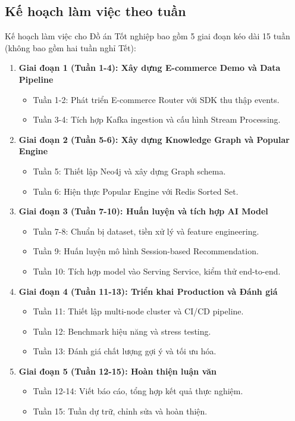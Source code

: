 \subsection{Kế hoạch làm việc theo tuần}

Kế hoạch làm việc cho Đồ án Tốt nghiệp bao gồm 5 giai đoạn kéo dài 15 tuần (không bao gồm hai tuần nghỉ Tết):

\begin{enumerate}
    \item \textbf{Giai đoạn 1 (Tuần 1-4): Xây dựng E-commerce Demo và Data Pipeline}
    \begin{itemize}
        \item Tuần 1-2: Phát triển E-commerce Router với SDK thu thập events.
        \item Tuần 3-4: Tích hợp Kafka ingestion và cấu hình Stream Processing.
    \end{itemize}

    \item \textbf{Giai đoạn 2 (Tuần 5-6): Xây dựng Knowledge Graph và Popular Engine}
    \begin{itemize}
        \item Tuần 5: Thiết lập Neo4j và xây dựng Graph schema.
        \item Tuần 6: Hiện thực Popular Engine với Redis Sorted Set.
    \end{itemize}

    \item \textbf{Giai đoạn 3 (Tuần 7-10): Huấn luyện và tích hợp AI Model}
    \begin{itemize}
        \item Tuần 7-8: Chuẩn bị dataset, tiền xử lý và feature engineering.
        \item Tuần 9: Huấn luyện mô hình Session-based Recommendation.
        \item Tuần 10: Tích hợp model vào Serving Service, kiểm thử end-to-end.
    \end{itemize}

    \item \textbf{Giai đoạn 4 (Tuần 11-13): Triển khai Production và Đánh giá}
    \begin{itemize}
        \item Tuần 11: Thiết lập multi-node cluster và CI/CD pipeline.
        \item Tuần 12: Benchmark hiệu năng và stress testing.
        \item Tuần 13: Đánh giá chất lượng gợi ý và tối ưu hóa.
    \end{itemize}

    \item \textbf{Giai đoạn 5 (Tuần 12-15): Hoàn thiện luận văn}
    \begin{itemize}
        \item Tuần 12-14: Viết báo cáo, tổng hợp kết quả thực nghiệm.
        \item Tuần 15: Tuần dự trữ, chỉnh sửa và hoàn thiện.
    \end{itemize}
\end{enumerate}

